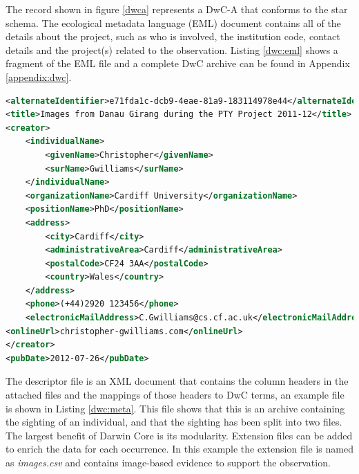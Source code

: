 
The record shown in figure \ref{dwca} represents a DwC-A that conforms to the star schema. The ecological metadata language (EML) document contains all of the details about the project, such as who is involved, the institution code, contact details and the project(s) related to the observation. Listing \ref{dwc:eml} shows a fragment of the EML file and a complete DwC archive can be found in Appendix \ref{appendix:dwc}.
\vspace{\baselineskip}
% 
\begin{lstlisting}[caption=Darwin Core Ecological Metadata File Fragment, label=dwc:eml, breaklines=true, language=XML]
<alternateIdentifier>e71fda1c-dcb9-4eae-81a9-183114978e44</alternateIdentifier>
<title>Images from Danau Girang during the PTY Project 2011-12</title>
<creator>
	<individualName>
		<givenName>Christopher</givenName>
		<surName>Gwilliams</surName>
	</individualName>
	<organizationName>Cardiff University</organizationName>
	<positionName>PhD</positionName>
	<address>
		<city>Cardiff</city>
		<administrativeArea>Cardiff</administrativeArea>
		<postalCode>CF24 3AA</postalCode>
		<country>Wales</country>
	</address>
	<phone>(+44)2920 123456</phone>
	<electronicMailAddress>C.Gwilliams@cs.cf.ac.uk</electronicMailAddress>
<onlineUrl>christopher-gwilliams.com</onlineUrl>
</creator>
<pubDate>2012-07-26</pubDate>
 \end{lstlisting}

The descriptor file is an XML document that contains the column headers in the attached files and the mappings of those headers to DwC terms, an example file is shown in Listing \ref{dwc:meta}. This file shows that this is an archive containing the sighting of an individual, and that the sighting has been split into two files. The largest benefit of Darwin Core is its modularity. Extension files can be added to enrich the data for each occurrence. In this example the extension file is named as \textit{images.csv} and contains image-based evidence to support the observation.

\noindent\begin{minipage}{\textwidth}

\end{minipage}

